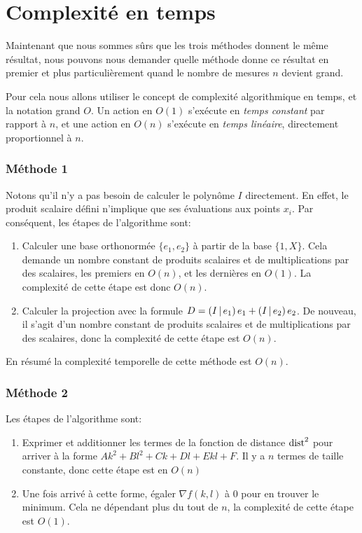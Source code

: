 \section{Complexité en temps}
\label{sec:approx-lin/temps}

Maintenant que nous sommes sûrs que les trois méthodes donnent le même
résultat, nous pouvons nous demander quelle méthode donne ce résultat
en premier et plus particulièrement quand le nombre de mesures $n$ devient
grand.

Pour cela nous allons utiliser le concept de complexité algorithmique
en temps, et la notation grand $O$.
Un action en $O(1)$ s'exécute en \emph{temps constant} par rapport à $n$,
et une action en $O(n)$ s'exécute en \emph{temps linéaire},
directement proportionnel à $n$.

\subsubsection*{Méthode 1}

Notons qu'il n'y a pas besoin de calculer le polynôme $I$ directement.
En effet, le produit scalaire défini n'implique que ses évaluations
aux points $x_i$.
Par conséquent, les étapes de l'algorithme sont:
\begin{enumerate}
    \item Calculer une base orthonormée $\{e_1,e_2\}$ à partir de la base
        $\{1,X\}$. Cela demande un nombre constant de produits scalaires
        et de multiplications par des scalaires,
        les premiers en $O(n)$, et les dernières en $O(1)$.
        La complexité de cette étape est donc $O(n)$.
    \item Calculer la projection avec la formule
        $D=\left(I\,\middle|\,e_1\right)e_1+\left(I\,\middle|\,e_2\right)e_2$.
        De nouveau, il s'agit d'un nombre constant de produits scalaires
        et de multiplications par des scalaires,
        donc la complexité de cette étape est $O(n)$.
\end{enumerate}

En résumé la complexité temporelle de cette méthode est $O(n)$.

\subsubsection*{Méthode 2}

Les étapes de l'algorithme sont:
\begin{enumerate}
    \item Exprimer et additionner les termes de la fonction de distance
        $\mathrm{dist}^2$ pour arriver à la forme $Ak^2+Bl^2+Ck+Dl+Ekl+F$.
        Il y a $n$ termes de taille constante, donc cette étape
        est en $O(n)$
    \item Une fois arrivé à cette forme, égaler $\nabla f(k,l)$ à 0
        pour en trouver le minimum.
        Cela ne dépendant plus du tout de $n$, la complexité de cette étape
        est $O(1)$.
\end{enumerate}

